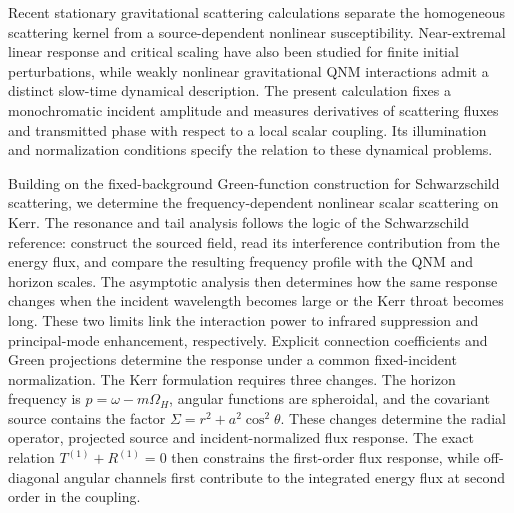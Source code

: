 \documentclass[aps,prd,twocolumn,10pt,nofootinbib,superscriptaddress,floatfix]{revtex4-2}
\begin{document}
Recent stationary gravitational scattering calculations separate the
homogeneous scattering kernel from a source-dependent nonlinear
susceptibility\cite{CardosoNonlinear2026}.  Near-extremal linear response
and critical scaling have also been studied for finite initial
perturbations\cite{GrallaTransient2016,GrallaCritical2018}, while weakly
nonlinear gravitational QNM interactions admit a distinct slow-time
dynamical description\cite{IulianoWeather2025}.
The present calculation fixes a monochromatic incident amplitude and
measures derivatives of scattering fluxes and transmitted phase with
respect to a local scalar coupling.  Its illumination and normalization
conditions specify the relation to these dynamical problems.

Building on the fixed-background Green-function construction for
Schwarzschild scattering\cite{HeTianZhangManuscript2026}, we determine the
frequency-dependent nonlinear scalar scattering on Kerr.
The resonance and tail analysis follows the logic of the Schwarzschild
reference: construct the sourced field, read its interference contribution
from the energy flux, and compare the resulting frequency profile with the
QNM and horizon scales.  The asymptotic analysis then determines how the
same response changes when the incident wavelength becomes large or the
Kerr throat becomes long.  These two limits link the interaction power to
infrared suppression and principal-mode enhancement, respectively.
Explicit connection coefficients and Green projections determine the
response under a common fixed-incident normalization.
The Kerr formulation requires three changes.  The horizon
frequency is $p=\omega-m\Omega_H$, angular functions are spheroidal, and the
covariant source contains the factor $\Sigma=r^2+a^2\cos^2\theta$.  These
changes determine the radial operator, projected source and incident-normalized
flux response.
The exact relation $T^{(1)}+R^{(1)}=0$ then constrains the first-order flux
response, while off-diagonal angular channels first contribute to the
integrated energy flux at second order in the coupling.
\end{document}
